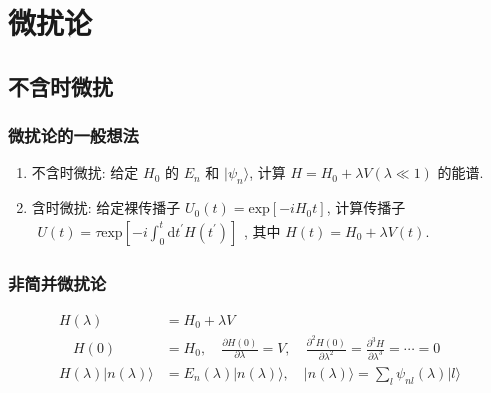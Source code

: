 \documentclass[../../main.tex]{subfiles}
\begin{document}
\section{微扰论}
\subsection{不含时微扰}
\subsubsection{微扰论的一般想法}
\begin{enumerate}
    \item 不含时微扰: 给定 $H_{0}$ 的 $E_{n}$ 和 $|\psi_{n}\rangle$, 计算 $H = H_{0} + \lambda V(\lambda\ll 1)$ 的能谱. 
    \item 含时微扰: 给定裸传播子 $U_{0}(t) = \text{exp}[-iH_{0}t]$, 计算传播子 $\begin{aligned}
        U(t) = \tau\text{exp}\left[-i\int_{0}^{t}\mathrm{d}t^{\prime}H(t^{\prime})\right]
    \end{aligned}$, 其中 $H(t) = H_{0} + \lambda V(t)$.
\end{enumerate}
\subsubsection{非简并微扰论}
\begin{align*}
    H(\lambda) &= H_{0} + \lambda V\\
    \quad H(0) &= H_{0},\quad \frac{\partial H(0)}{\partial\lambda} = V,\quad \frac{\partial^{2}H(0)}{\partial\lambda^{2}} = \frac{\partial^{3}H}{\partial\lambda^{3}} = \cdots = 0\\
    H(\lambda)|n(\lambda)\rangle &= E_{n}(\lambda)|n(\lambda)\rangle,\quad |n(\lambda)\rangle = \sum_{l}\psi_{nl}(\lambda)|l\rangle
\end{align*}
\end{document}
